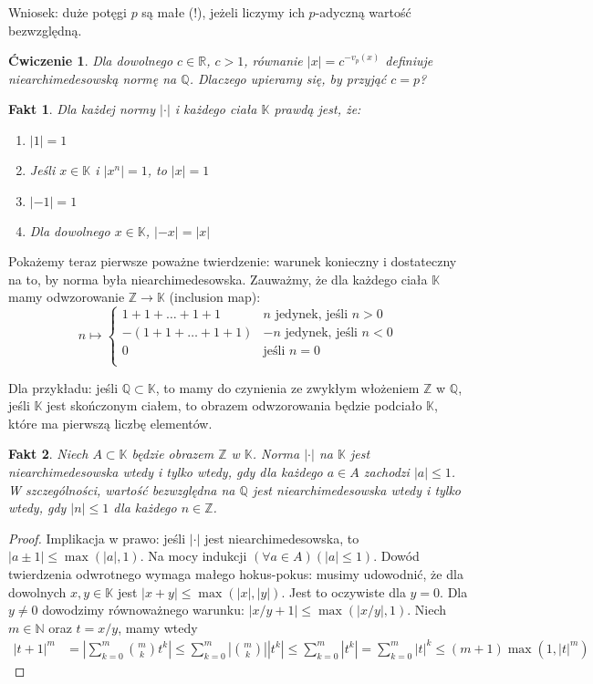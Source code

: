 \documentclass[a4paper,fleqn]{article}
\newtheorem{prb}[prbh]{\'Cwiczenie}
\newtheorem{fkt}{Fakt}
\newenvironment{enumx}{\begin{enumerate}
	\setlength{\itemsep}{0pt}
	\setlength{\parskip}{0pt}
	\setlength{\parsep}{0pt}}
{\end{enumerate}}
\begin{document}
\begin{multicols}{2}
Wniosek: duże potęgi $p$ są małe (!), jeżeli liczymy ich $p$-adyczną wartość bezwzględną.

\begin{prb}Dla dowolnego $c\in\mathbb R$, $c>1$, równanie $|x| = c^{-v_p(x)}$ definiuje niearchimedesowską normę na $\mathbb Q$. Dlaczego upieramy się, by przyjąć $c=p$?\end{prb}

\begin{fkt}Dla każdej normy $|\cdot|$ i każdego ciała $\mathbb K$ prawdą jest, że:
\begin{enumx}
\item $|1| = 1$
\item Jeśli $x\in\mathbb K$ i $|x^n| = 1$, to $|x| = 1$
\item $|-1| = 1$
\item Dla dowolnego $x\in\mathbb K$, $|-x| = |x|$
\end{enumx}
\end{fkt}

Pokażemy teraz pierwsze poważne twierdzenie: warunek konieczny i dostateczny na to, by norma była niearchimedesowska. Zauważmy, że dla każdego ciała $\mathbb K$ mamy odwzorowanie $\mathbb Z \rightarrow \mathbb K$ (inclusion map):
\[
n \mapsto
\begin{cases}
{1 + 1 + \dots + 1 + 1} & n\text{ jedynek, jeśli } n > 0 \\
- ({1 + 1 + \dots + 1 + 1}) & -n \text{ jedynek, jeśli } n < 0 \\
   0       & \text{jeśli } n =  0 \\
  \end{cases}
\]

Dla przykładu: jeśli $\mathbb Q \subset \mathbb K$, to mamy do czynienia ze zwykłym włożeniem $\mathbb Z$ w $\mathbb Q$, jeśli $\mathbb K$ jest skończonym ciałem, to obrazem odwzorowania będzie podciało $\mathbb K$, które ma pierwszą liczbę elementów.

\begin{fkt}Niech $A\subset \mathbb K$ będzie obrazem $\mathbb Z$ w $\mathbb K$. Norma $|\cdot |$ na $\mathbb K$ jest niearchimedesowska wtedy i tylko wtedy, gdy dla każdego $a\in A$ zachodzi $|a| \le 1$. W szczególności, wartość bezwzględna na $\mathbb Q$ jest niearchimedesowska wtedy i tylko wtedy, gdy $|n|\le 1$ dla każdego $n\in \mathbb Z$.\end{fkt}

\begin{proof}Implikacja w prawo: jeśli $|\cdot|$ jest niearchimedesowska, to $|a\pm 1| \le \max(|a|, 1)$. Na mocy indukcji $(\forall a \in A)(|a| \le 1).$ Dowód twierdzenia odwrotnego wymaga małego hokus-pokus: musimy udowodnić, że dla dowolnych $x,y\in\mathbb K$ jest $|x+y|\le \max(|x|,|y|)$. Jest to oczywiste dla $y=0$. Dla $y\neq 0$ dowodzimy równoważnego warunku: $|x/y+1| \le \max (|x/y|,1)$. Niech $m\in \mathbb N$ oraz $t = x/y$, mamy wtedy
\begin{align*}|t+1|^m & = \left| \sum_{k=0}^m {m \choose k} t^k\right| \le \sum_{k=0}^m \left|{m \choose k}\right|\left| t^k\right| \le \sum_{k=0}^m \left| t^k\right| = \sum_{k=0}^m \left| t\right|^k \le (m+1) \max(1, |t|^m)\end{align*}


\end{proof}
\end{multicols}
\end{document}
